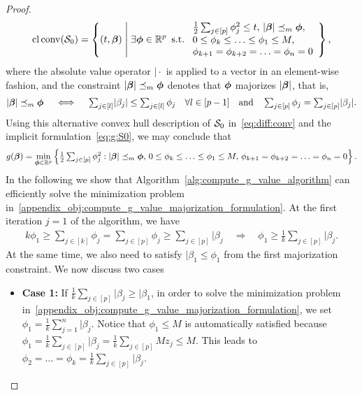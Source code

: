 \begin{proof}
\begin{align}
    \label{eq:diff:conv}
    \operatorname{cl} \operatorname{conv}(\mathcal{S}_0) = \left\{ (t, \bm{\beta}) \;\middle|\; \exists \bm{\phi} \in \mathbb{R}^p ~ \operatorname{s.\!t.\!} ~
    \begin{array}{l}
        \frac{1}{2} \sum_{j \in [p]} \phi_j^2 \leq t, \, \lvert \bm{\beta} \rvert \preceq_m \bm{\phi}, \\
        0 \leq \phi_k \leq \ldots \leq \phi_1 \leq M, \\
        \phi_{k+1} = \phi_{k+2} = \ldots = \phi_n = 0 
    \end{array}
    \right\},
\end{align}
where the absolute value operator $\vert{\cdot}$ is applied to a vector in an element-wise fashion, and the constraint $\lvert \bm{\beta} \rvert \preceq_m \bm{\phi}$ denotes that $\bm{\phi}$ majorizes $\lvert \bm{\beta} \rvert$, that is,
\begin{align*}
    \textstyle \lvert \bm{\beta} \rvert \preceq_m \bm{\phi}  \quad \iff \quad  \sum_{j \in [l]} \lvert \beta_j \rvert \leq \sum_{j \in [l]} \phi_j \quad \forall l \in [p-1] \quad \text{and} \quad \sum_{j \in [p]} \phi_j = \sum_{j \in [p]} \lvert \beta_j \rvert.
\end{align*}
Using this alternative convex hull description of $\mathcal{S}_0$ in~\eqref{eq:diff:conv} and the implicit formulation~\eqref{eq:g:S0}, we may conclude that
\begin{align}
    g(\bm{\beta}) = \min\limits_{\bm{\phi} \in \mathbb{R}^p}
    \textstyle \left\{ \frac{1}{2} \sum_{j \in [p]} \phi_j^2 :  \lvert \bm{\beta} \rvert \preceq_m \bm{\phi}, \, 0 \leq \phi_k \leq \ldots \leq \phi_1 \leq M, \, \phi_{k+1} = \phi_{k+2} = \ldots = \phi_n = 0
    \right\}. \label{appendix_obj:compute_g_value_majorization_formulation}
\end{align}
In the following we show that Algorithm~\ref{alg:compute_g_value_algorithm} can efficiently solve the minimization problem in~\eqref{appendix_obj:compute_g_value_majorization_formulation}. At the first iteration $j=1$ of the algorithm, we have
\begin{align*}
    \textstyle k \phi_1 \geq \sum_{j \in [k]} \phi_j = \sum_{j \in [p]} \phi_j \geq \sum_{j \in [p]} \vert{\beta_j} \quad \Rightarrow \quad \phi_1 \geq \frac{1}{k} \sum_{j \in [p]} \vert{\beta_j}.
\end{align*}
At the same time, we also need to satisfy $\vert{\beta_1} \leq \phi_1$ from the first majorization constraint. We now discuss two cases
\begin{itemize}[label=$\diamond$,leftmargin=*]
    \item \textbf{Case 1:} If $\frac{1}{k} \sum_{j \in [p]} \vert{\beta_j} \geq \vert{\beta_1}$, in order to solve the minimization problem in~\eqref{appendix_obj:compute_g_value_majorization_formulation}, we set $\phi_1 = \frac{1}{k} \sum_{j=1}^n \vert{\beta_j}$. Notice that $\phi_1 \leq M$ is automatically satisfied because $\phi_1 = \frac{1}{k} \sum_{j \in [p]} \vert{\beta_j} = \frac{1}{k} \sum_{j \in [p]} M z_j \leq M$. This leads to $\phi_2 = \ldots = \phi_k = \frac{1}{k} \sum_{j \in [p]} \vert{\beta_j}$.

\end{itemize}
\end{proof}
